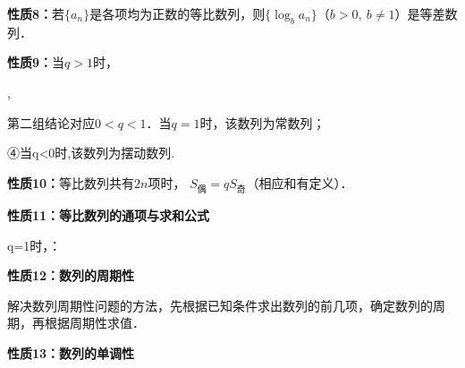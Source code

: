 \par\medskip\noindent\textbf{性质8：}若$\{a_n\}$是各项均为正数的等比数列，则$\{\log_ba_n\}$（$b>0,\ b\ne1$）是等差数列．\par
\par\medskip\noindent\textbf{性质9：}当$q>1$时，\par
{},                 \par
第二组结论对应$0<q<1$．当$q=1$时，该数列为常数列；\par
④当q<0时,该数列为摆动数列.\par
\par\medskip\noindent\textbf{性质10：}等比数列共有$2n$项时，
$S_{\text{偶}}=qS_{\text{奇}}$（相应和有定义）．\par
\par\medskip\noindent\textbf{性质11：等比数列的通项与求和公式}\par
{}q=1时，：\par
\par\medskip\noindent\textbf{性质12：数列的周期性}\par
\qquad{}解决数列周期性问题的方法，先根据已知条件求出数列的前几项，确定数列的周期，再根据周期性求值．\par
\par\medskip\noindent\textbf{性质13：数列的单调性}\par

